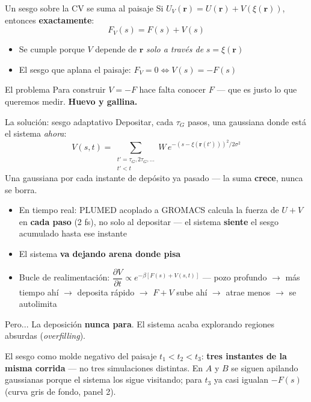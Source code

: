 \documentclass[aspectratio=169,11pt]{beamer}
\begin{document}
\begin{frame}{Un sesgo sobre la CV se suma al paisaje}
  Si $U_V(\mathbf{r}) = U(\mathbf{r}) + V(\xi(\mathbf{r}))$, entonces \textbf{exactamente}:
  $$\boxed{F_V(s) = F(s) + V(s)}$$
  \vspace{0.4em}
  \begin{itemize}
    \item Se cumple porque $V$ depende de $\mathbf{r}$ \emph{solo a través de} $s=\xi(\mathbf{r})$
    \item El sesgo que aplana el paisaje: $F_V = 0 \iff V(s) = -F(s)$
  \end{itemize}
  \begin{alertblock}{El problema}
    Para construir $V=-F$ hace falta conocer $F$ — que es justo lo que queremos medir. \textbf{Huevo y gallina.}
  \end{alertblock}
\end{frame}

\begin{frame}{La solución: sesgo adaptativo}
  Depositar, cada $\tau_G$ pasos, una gaussiana donde está el sistema \emph{ahora}:
  $$V(s,t) = \sum_{\substack{t'=\tau_G,2\tau_G,\dots \\ t' < t}} W\, e^{-(s-\xi(\mathbf{r}(t')))^2/2\sigma^2}$$
  \vspace{0.2em}
  {\scriptsize\color{migris} Una gaussiana por cada instante de depósito ya pasado — la suma \textbf{crece}, nunca se borra.}
  \vspace{0.3em}
  \begin{itemize}
    \item \alert{En tiempo real}: PLUMED acoplado a GROMACS calcula la fuerza de $U+V$ en \textbf{cada paso} (2 fs), no solo al depositar — el sistema \textbf{siente} el sesgo acumulado hasta ese instante
    \item El sistema \textbf{va dejando arena donde pisa}
    \item Bucle de realimentación: $\dfrac{\partial V}{\partial t} \propto e^{-\beta[F(s)+V(s,t)]}$ — pozo profundo $\to$ más tiempo ahí $\to$ deposita rápido $\to$ $F+V$ sube ahí $\to$ atrae menos $\to$ se autolimita
  \end{itemize}
  \begin{alertblock}{Pero...}
    La deposición \textbf{nunca para}. El sistema acaba explorando regiones absurdas (\emph{overfilling}).
  \end{alertblock}
\end{frame}

\begin{frame}{El sesgo como molde negativo del paisaje}
  \centering
  \resizebox{\textwidth}{!}{\MoldeNegativoFigure[1]}
  \vspace{0.4em}
  \small\color{migris} $t_1<t_2<t_3$: \textbf{tres instantes de la misma corrida} — no tres simulaciones distintas. En $A$ y $B$ se siguen apilando gaussianas porque el sistema los sigue visitando; para $t_3$ ya casi igualan $-F(s)$ (curva gris de fondo, panel 2).
\end{frame}
\end{document}
